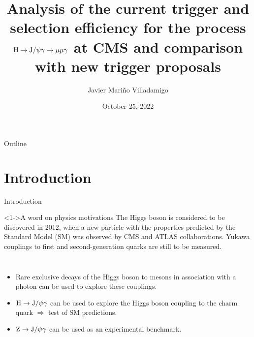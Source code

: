 \documentclass[aspectratio = 1610, xcolor = dvipsnames]{beamer}
\title[]{{\large  Analysis of the current trigger and selection efficiency for the process $\H \rightarrow \JPsi\gamma \rightarrow \mu\mu\gamma$ at CMS and comparison with new trigger proposals}} %
\author{Javier Mariño Villadamigo} %
\institute[unipd] %
{
	\scriptsize{Research Activities} \\ 
	\scriptsize{Academic year: 2021/2022} \\
	\smallskip
	\scriptsize{Università degli studi di Padova} %
}
\date{October 25, 2022} %
\newcommand{\JPsi}{{\rm J}/\psi}
\begin{document}
	
	\begin{frame}
		\titlepage %
	\end{frame}

	
	
	
	
	\begin{frame}[t]{Outline}
        \tableofcontents
	\end{frame}
	
	
    \section{Introduction}
    
    \begin{frame}[t]{Introduction}

        \begin{block}<1->{A word on physics motivations}
            The Higgs boson is considered to be discovered in 2012, when a new particle with the properties predicted by the Standard Model (SM) was observed by CMS and ATLAS collaborations. Yukawa couplings to first and second-generation quarks are still to be measured.
        \end{block}

        \begin{columns}[c]

            
            \begin{itemize}
                \item \textcolor{unipd}{Rare exclusive decays} of the Higgs boson to mesons in association with a photon can be used to explore these couplings.
                \item ${\rm H}\rightarrow \JPsi \gamma$ can be used to explore the Higgs boson \textcolor{unipd}{coupling to the charm quark} $\Rightarrow$ \textcolor{unipd}{test of SM predictions}.
                \item ${\rm Z}\rightarrow \JPsi \gamma$ can be used as an \textcolor{unipd}{experimental benchmark}.
            \end{itemize}

        \end{columns}
    \end{frame}
	
\end{document}
